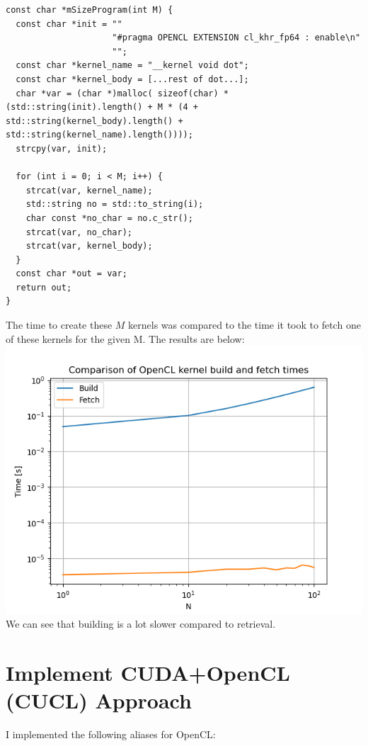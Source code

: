\documentclass[11pt]{article}
\begin{document}
\begin{tiny}
\begin{verbatim}
const char *mSizeProgram(int M) {
  const char *init = ""
                     "#pragma OPENCL EXTENSION cl_khr_fp64 : enable\n"
                     "";
  const char *kernel_name = "__kernel void dot";
  const char *kernel_body = [...rest of dot...];
  char *var = (char *)malloc( sizeof(char) * (std::string(init).length() + M * (4 + std::string(kernel_body).length() + std::string(kernel_name).length())));
  strcpy(var, init);

  for (int i = 0; i < M; i++) {
    strcat(var, kernel_name);
    std::string no = std::to_string(i);
    char const *no_char = no.c_str();
    strcat(var, no_char);
    strcat(var, kernel_body);
  }
  const char *out = var;
  return out;
}

\end{verbatim}
\end{tiny}

The time to create these $M$ kernels was compared to the time it took to fetch one of these kernels for the given M. The results are below:\\

\includegraphics[scale=0.6]{plots/4.png}
\\
We can see that building is a lot slower compared to retrieval.
\newpage
\section{Implement CUDA+OpenCL (CUCL) Approach}

I implemented the following aliases for OpenCL:
\end{document}
